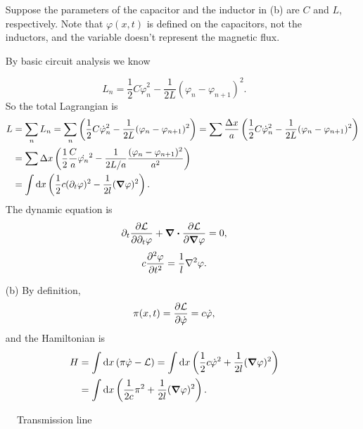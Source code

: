 \documentclass[hyperref, a4paper]{article}
\begin{document}
\begin{itemize}
Suppose the parameters of the capacitor and the inductor in (b)
are $C$ and $L$, respectively.
Note that $\varphi(x, t)$ is defined on the capacitors, not the inductors,
and the variable doesn't represent the magnetic flux.

By basic circuit analysis we know 

\begin{equation}
    L_{n} = \frac{1}{2} C \dot{\varphi}_n^2 - \frac{1}{2 L} (\varphi_n - \varphi_{n+1})^2.
\end{equation}
So the total Lagrangian is 
\begin{equation}
    \begin{aligned}
        L &= \sum_n L_n = 
        \sum_n \left( \frac{1}{2} C \dot{\varphi}_n^2 - \frac{1}{2 L} (\varphi_n - \varphi_{n+1})^2 \right) 
        = \sum \frac{\Delta{x}}{a} 
        \left( \frac{1}{2} C \dot{\varphi}_n^2 - \frac{1}{2 L} (\varphi_n - \varphi_{n+1})^2 \right) \\
        &= \sum \Delta{x} \left(
            \frac{1}{2} \frac{C}{a} \dot{\varphi_n}^2 
            - \frac{1}{2 L / a} 
            \frac{(\varphi_n - \varphi_{n+1})^2}{a^2}  
        \right) \\
        &= \int \dd{x} \left(
            \frac{1}{2} c (\partial_t \varphi)^2 - \frac{1}{2 l} (\grad{\varphi})^2
        \right).
    \end{aligned}
\end{equation}
The dynamic equation is 
\[
    \partial_t \pdv{\mathcal{L}}{\partial_t \varphi} + \div \pdv{\mathcal{L}}{\grad{\varphi}} = 0,
\]
\begin{equation}
    c \pdv[2]{\varphi}{t} = \frac{1}{l} \laplacian \varphi.
\end{equation}

\item[(b)] By definition, 
\begin{equation}
    \pi(x, t) = \pdv{\mathcal{L}}{\dot{\varphi}} = c \dot{\varphi},
\end{equation}
and the Hamiltonian is 
\begin{equation}
    \begin{aligned}
        H &= \int \dd{x} (\pi \dot{\varphi} - \mathcal{L}) 
        = \int \dd{x} \left( \frac{1}{2} c \dot{\varphi}^2 + \frac{1}{2l} (\grad{\varphi})^2 \right) \\
        &= \int \dd{x} \left( \frac{1}{2c} \pi^2 + \frac{1}{2l} (\grad{\varphi})^2 \right) .
    \end{aligned}
\end{equation}

\end{itemize}

\begin{figure}
    \centering
    
    \caption{Transmission line}
    \label{fig:transmission}
\end{figure}
\end{document}

